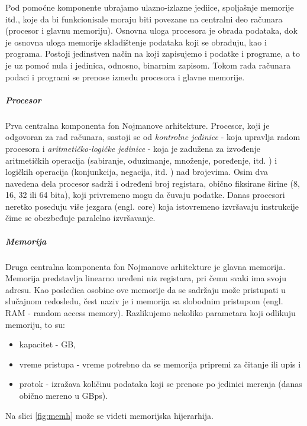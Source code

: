 \documentclass[a4paper]{article}
\begin{document}
Pod pomoćne komponente ubrajamo ulazno-izlazne jediice, spoljašnje memorije itd., koje da bi funkcionisale moraju biti povezane na centralni deo računara (procesor i glavnu memoriju).
Osnovna uloga procesora je obrada podataka, dok je osnovna uloga memorije skladištenje podataka koji se obrađuju, kao i programa. Postoji jedinstven način na koji zapisujemo i podatke i programe, a to je uz pomoć nula i jedinica, odnosno, binarnim zapisom. Tokom rada računara podaci i programi se prenose između procesora i glavne memorije.
\subparagraph{Procesor} Prva centralna komponenta fon Nojmanove arhitekture. Procesor, koji je odgovoran za rad računara, sastoji se od \textit{kontrolne jedinice} - koja upravlja radom procesora i \textit{aritmetičko-logičke jedinice} - koja je zadužena za izvođenje aritmetičkih operacija (sabiranje, oduzimanje, množenje, poređenje, itd. ) i logičkih operacija (konjunkcija, negacija, itd. ) nad brojevima. Osim dva navedena dela procesor sadrži i određeni broj registara, obično fiksirane širine (8, 16, 32 ili 64 bita), koji privremeno mogu da čuvaju podatke. Danas procesori neretko poseduju više jezgara (engl. core) koja istovremeno izvršavaju instrukcije čime se obezbeđuje paralelno izvršavanje.
\subparagraph{Memorija} Druga centralna komponenta fon Nojmanove arhitekture
je glavna memorija. Memorija predstavlja linearno uređeni niz registara, pri čemu svaki ima svoju adresu. Kao posledica osobine ove memorije da se sadržaju može pristupati u slučajnom redosledu, čest naziv je i memorija sa slobodnim pristupom (engl. RAM - random access memory). Razlikujemo nekoliko parametara koji odlikuju memoriju, to su:
\begin{itemize}
\item kapacitet - GB,
\item vreme pristupa - vreme potrebno da se memorija pripremi za čitanje ili upis i 
\item protok - izražava količinu podataka koji se prenose po jedinici merenja (danas obično mereno u GBps).
\end{itemize}
Na slici \ref{fig:memh} može se videti memorijska hijerarhija.
\end{document}
